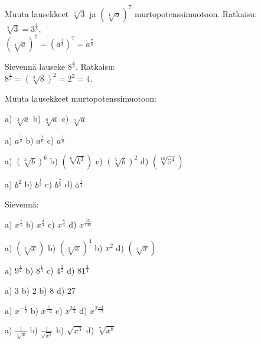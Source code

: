\begin{esimerkki}
Muuta lausekkeet $\sqrt[5]{3}$ ja $(\sqrt[4]{a})^7$ murtopotenssimuotoon. Ratkaisu: \\
$\sqrt[5]{3} = 3^\frac{1}{5}$, \\
$(\sqrt[4]{a})^7 = (a^\frac{1}{4})^7=a^\frac{7}{4}$
\end{esimerkki}

\begin{esimerkki}
Sievennä lauseke $8^\frac{2}{3}$. Ratkaisu: \\
 $8^\frac{2}{3} = (\sqrt[3]{8})^2 = 2^2 = 4.$
\end{esimerkki}

Muuta lausekkeet murtopotenssimuotoon:

\begin{tehtava}
a) $\sqrt[3]{a}$ \qquad
b) $\sqrt[6]{a}$ \qquad
c) $\sqrt[n]{a}$ 
\begin{vastaus}	
a) $a^\frac{1}{3}$ \qquad
b) $a^\frac{1}{6}$ \qquad
c) $a^\frac{1}{n}$ \qquad
\end{vastaus}
\end{tehtava}

\begin{tehtava}
a) $(\sqrt[3]{b})^6$ \qquad
b) $(\sqrt[6]{b^3})$ \qquad
c) $(\sqrt[5]{b})^2$ \qquad
d) $(\sqrt[16]{ö^4})$
\begin{vastaus}	
a) $b^2$ \qquad
b) $b^\frac{1}{2}$ \qquad
c) $b^\frac{2}{5}$ \qquad
d) $ö^\frac{1}{4}$
\end{vastaus}
\end{tehtava}

Sievennä:
\begin{tehtava}
a) $x^\frac{1}{5}$ \qquad
b) $x^\frac{4}{3}$ \qquad
c) $x^\frac{8}{4}$ \qquad
d) $x^\frac{25}{100}$ \qquad
\begin{vastaus}	
a) $(\sqrt[5]{x})$ \qquad
b) $(\sqrt[3]{x})^4$ \qquad
b) $x^2$ \qquad
d) $(\sqrt[4]{x})$ 
\end{vastaus}
\end{tehtava}

\begin{tehtava}
a) $9^\frac{1}{2}$ \qquad
b) $8^\frac{1}{3}$ \qquad
c) $4^\frac{3}{2}$ \qquad
d) $81^\frac{3}{4}$ \qquad
\begin{vastaus}	
a) $3$ \qquad
b) $2$ \qquad
b) $8$ \qquad
d) $27$ 
\end{vastaus}
\end{tehtava}

\begin{tehtava}
a) $x^{-\frac{1}{3}}$ \qquad
b) $x^\frac{5}{-2}$ \qquad
c) $x^{3 \frac{1}{2}}$ \qquad
d) $x^{2 \frac{-4}{-7}}$ \qquad
\begin{vastaus}	
a) $\frac{1}{\sqrt[3]{x}}$ \qquad
b) $\frac{1}{\sqrt{x^5}}$ \qquad
b) $\sqrt{x^3}$ \qquad
d) $\sqrt[7]{x^8}$ 
\end{vastaus}
\end{tehtava}

